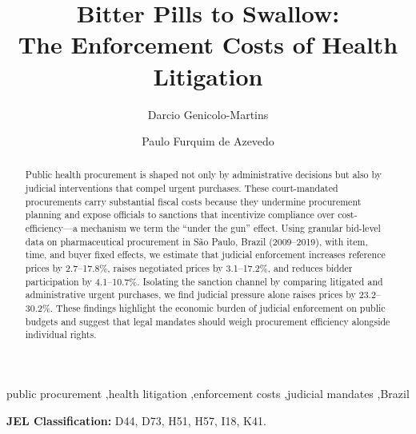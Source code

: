 \documentclass[12pt]{elsarticle}
\begin{document}
\begin{frontmatter}
\title{Bitter Pills to Swallow:\\ The Enforcement Costs of Health Litigation}

\author[INSPER]{Darcio Genicolo-Martins}
\author[INSPER]{Paulo Furquim de Azevedo}
\address[INSPER]{Insper Institute of Education and Research, S\~ao Paulo, Brazil}

\begin{abstract}
Public health procurement is shaped not only by administrative decisions but also by judicial interventions that compel urgent purchases. These court-mandated procurements carry substantial fiscal costs because they undermine procurement planning and expose officials to sanctions that incentivize compliance over cost-efficiency---a mechanism we term the ``under the gun'' effect. Using granular bid-level data on pharmaceutical procurement in S\~ao Paulo, Brazil (2009--2019), with item, time, and buyer fixed effects, we estimate that judicial enforcement increases reference prices by 2.7--17.8\%, raises negotiated prices by 3.1--17.2\%, and reduces bidder participation by 4.1--10.7\%. Isolating the sanction channel by comparing litigated and administrative urgent purchases, we find judicial pressure alone raises prices by 23.2--30.2\%. These findings highlight the economic burden of judicial enforcement on public budgets and suggest that legal mandates should weigh procurement efficiency alongside individual rights.
\end{abstract}

\begin{keyword}
public procurement \sep health litigation \sep enforcement costs \sep judicial mandates \sep Brazil
\end{keyword}

\end{frontmatter}

\noindent\textbf{JEL Classification:} D44, D73, H51, H57, I18, K41.

\bigskip
\clearpage
\begin{sloppypar}









\clearpage



\clearpage


\end{sloppypar}
\end{document}
